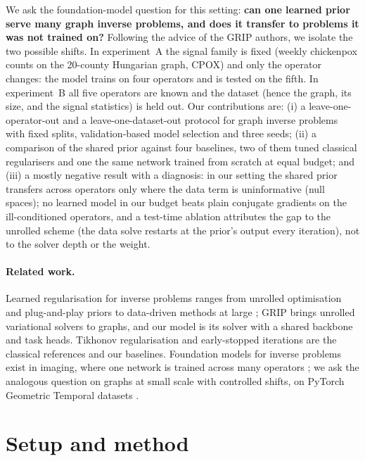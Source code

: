 \documentclass{article}
\begin{document}
We ask the foundation-model question for this setting: \textbf{can one learned prior serve many graph inverse
problems, and does it transfer to problems it was not trained on?} Following the advice of the GRIP authors,
we isolate the two possible shifts. In experiment~A the signal family is fixed (weekly chickenpox counts on the
20-county Hungarian graph, CPOX) and only the operator changes: the model trains on four operators and is
tested on the fifth. In experiment~B all five operators are known and the dataset (hence the graph, its size,
and the signal statistics) is held out. Our contributions are:
(i) a leave-one-operator-out and a leave-one-dataset-out protocol for graph inverse problems with fixed
splits, validation-based model selection and three seeds;
(ii) a comparison of the shared prior against four baselines, two of them tuned classical regularisers and one
the same network trained from scratch at equal budget; and
(iii) a mostly negative result with a diagnosis: in our setting the shared prior transfers across operators only
where the data term is uninformative (null spaces); no learned model in our budget beats plain conjugate
gradients on the ill-conditioned operators, and a test-time ablation attributes the gap to the unrolled scheme
(the data solve restarts at the prior's output every iteration), not to the solver depth or the weight.

\paragraph{Related work.}
Learned regularisation for inverse problems ranges from unrolled optimisation \citep{gregor2010lista,
monga2021unrolling} and plug-and-play priors \citep{venkatakrishnan2013pnp} to data-driven methods at large
\citep{arridge2019datadriven}; GRIP \citep{eliasof2025grip} brings unrolled variational solvers to graphs, and
our model is its solver with a shared backbone and task heads. Tikhonov regularisation and early-stopped
iterations are the classical references \citep{hansen1998rank, engl1996regularization} and our baselines.
Foundation models \citep{bommasani2021foundation} for inverse problems exist in imaging, where one network is
trained across many operators \citep{terris2025ram}; we ask the analogous question on graphs at small scale
with controlled shifts, on PyTorch Geometric Temporal datasets \citep{rozemberczki2021pgt}.

\section{Setup and method}
\end{document}
